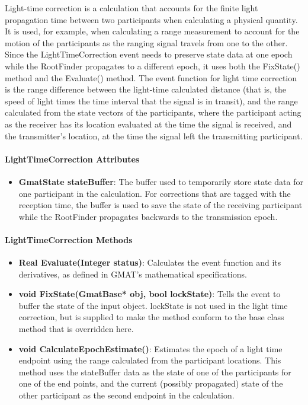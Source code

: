 Light-time correction is a calculation that accounts for the finite light propagation time between two participants when calculating a physical quantity.  It is used, for example, when calculating a range measurement to account for the motion of the participants as the ranging signal travels from one to the other.  Since the LightTimeCorrection event needs to preserve state data at one epoch while the RootFinder propagates to a different epoch, it uses both the FixState() method and the Evaluate() method.  The event function for light time correction is the range difference between the light-time calculated distance (that is, the speed of light times the time interval that the signal is in transit), and the range calculated from the state vectors of the participants, where the participant acting as the receiver has its location evaluated at the time the signal is received, and the transmitter's location, at the time the signal left the transmitting participant.

\paragraph{LightTimeCorrection Attributes}

\begin{itemize}
\item \textbf{GmatState stateBuffer}:  The buffer used to temporarily store state data for one participant in the calculation.  For corrections that are tagged with the reception time, the buffer is used to save the state of the receiving participant while the RootFinder propagates backwards to the transmission epoch.
\end{itemize}

\paragraph{LightTimeCorrection Methods}

\begin{itemize}
\item \textbf{Real Evaluate(Integer status)}:  Calculates the event function and its derivatives, as defined in GMAT's mathematical specifications\cite{mathSpec}.
\item \textbf{void FixState(GmatBase* obj, bool lockState)}:  Tells the event to buffer the state of the input object.  lockState is not used in the light time correction, but is supplied to make the method conform to the base class method that is overridden here.
\item \textbf{void CalculateEpochEstimate()}:  Estimates the epoch of a light time endpoint using the range calculated from the participant locations.  This method uses the stateBuffer data as the state of one of the participants for one of the end points, and the current (possibly propagated) state of the other participant as the second endpoint in the calculation.
\end{itemize}

